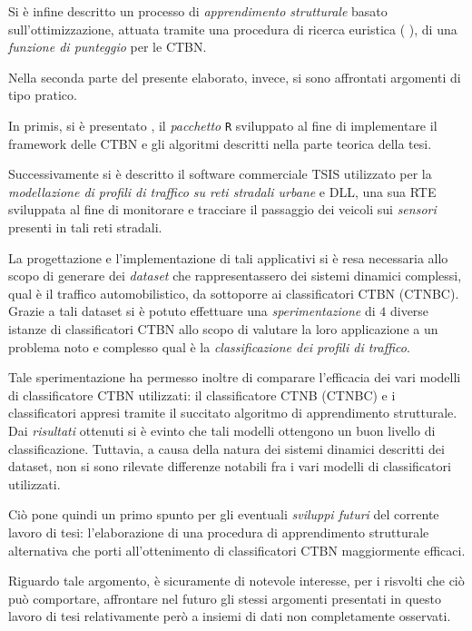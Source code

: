 Si è infine descritto un processo di \emph{apprendimento strutturale} basato sull'ottimizzazione, attuata tramite una procedura di ricerca euristica (\ie{} \emph{\hc{}}), di una \emph{funzione di punteggio} per le \acs{CTBN}.

Nella seconda parte del presente elaborato, invece, si sono affrontati argomenti di tipo pratico.

In primis, si è presentato \rctbn{}, il \emph{pacchetto} \lstinline$R$ sviluppato al fine di implementare il framework delle \acs{CTBN} e gli algoritmi descritti nella parte teorica della tesi.

Successivamente si è descritto il software commerciale \acs{TSIS} utilizzato per la \emph{modellazione di profili di traffico su reti stradali urbane} e  \acs{DLL}, una sua \acl{RTE} sviluppata al fine di monitorare e tracciare il passaggio dei veicoli sui \emph{sensori} presenti in tali reti stradali.

La progettazione e l'implementazione di tali applicativi si è resa necessaria allo scopo di generare dei \emph{dataset} che rappresentassero dei sistemi dinamici complessi, qual è il traffico automobilistico, da sottoporre ai classificatori \acs{CTBN} (\acs{CTNBC}). Grazie a tali dataset si è potuto effettuare una \emph{sperimentazione} di $4$ diverse istanze di classificatori \acs{CTBN} allo scopo di valutare la loro applicazione a un problema noto e complesso qual è la \emph{classificazione dei profili di traffico}.

Tale sperimentazione ha permesso inoltre di comparare l'efficacia dei vari modelli di classificatore \acs{CTBN} utilizzati: il classificatore \acl{CTNB} (\acs{CTNBC}) e i classificatori appresi tramite il succitato algoritmo di apprendimento strutturale. Dai \emph{risultati} ottenuti si è evinto che tali modelli ottengono un buon livello di classificazione. Tuttavia, a causa della natura dei sistemi dinamici descritti dei dataset, non si sono rilevate differenze notabili fra i vari modelli di classificatori utilizzati.

Ciò pone quindi un primo spunto per gli eventuali \emph{sviluppi futuri} del corrente lavoro di tesi: l'elaborazione di una procedura di apprendimento strutturale alternativa che porti all'ottenimento di classificatori \acs{CTBN} maggiormente efficaci.

Riguardo tale argomento, è sicuramente di notevole interesse, per i risvolti che ciò può comportare, affrontare nel futuro gli stessi argomenti presentati in questo lavoro di tesi relativamente però a insiemi di dati non completamente osservati.

